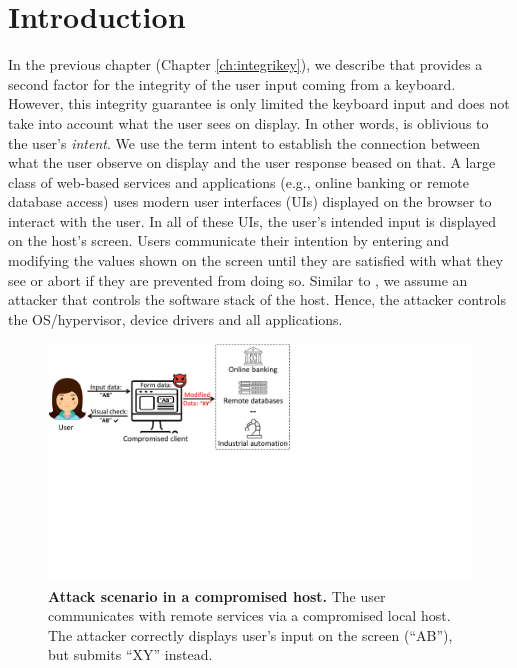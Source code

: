 \section{Introduction}
\label{integriscreen:sec:intro}

In the previous chapter (Chapter \ref{ch:integrikey}), we describe \integrikey that provides a second factor for the integrity of the user input coming from a keyboard. However, this integrity guarantee is only limited the keyboard input and does not take into account what the user sees on display. In other words, \integrikey is oblivious to the user's \emph{intent}. We use the term intent to establish the connection between what the user observe on display and the user response beased on that. A large class of web-based services and applications (e.g., online banking or remote database access) uses modern user interfaces (UIs) displayed on the browser to interact with the user. In all of these UIs, the user's intended input is displayed on the host's screen. Users communicate their intention by entering and modifying the values shown on the screen until they are satisfied with what they see or abort if they are prevented from doing so. Similar to \integrikey, we assume an attacker that controls the software stack of the host. Hence, the attacker controls the OS/hypervisor, device drivers and all applications. 


\begin{figure}[t]
 \centering
\includegraphics[trim={0 10.4cm 14.4cm 0},clip,width=0.75\linewidth]{chapters/IntegriScreen/img/motivatingScenario.pdf}
\caption[Attack scenario in a compromised host]{\textbf{Attack scenario in a compromised host.}
 	The user communicates with remote services via a compromised local host. The attacker correctly displays user's input on the screen (``AB''), but submits ``XY'' instead.
 	}
 \label{fig:scenario}
\end{figure}



